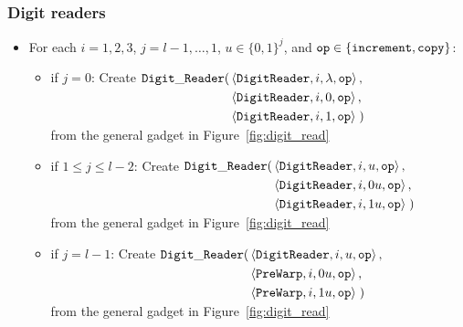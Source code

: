 \subsubsection{ Digit readers }

\begin{itemize}

\item For each $i = 1,2,3$,
                   $j = l-1,\ldots,1$,
                   $u \in \{0, 1\}^j$, and
                   ${\tt op} \in \{{\tt increment}, {\tt copy} \}$:
    \begin{itemize}
        \item if $j = 0$:
        Create
        $\begin{aligned}[t]
            {\tt Digit\_Reader}(& \left\langle {\tt DigitReader}, i, \lambda, {\tt op} \right\rangle, \\
                     & \left\langle {\tt DigitReader}, i, 0, {\tt op} \right\rangle, \\
                     & \left\langle {\tt DigitReader}, i, 1, {\tt op} \right\rangle \;)
        \end{aligned}$\\
        from the general gadget in Figure~\ref{fig:digit_read}

        \item if $1 \leqslant j \leqslant l -2$:
        Create
        $\begin{aligned}[t]
        {\tt Digit\_Reader}(& \left\langle {\tt DigitReader}, i, u, {\tt op} \right\rangle, \\
                 & \left\langle {\tt DigitReader}, i, 0u, {\tt op} \right\rangle, \\
                 & \left\langle {\tt DigitReader}, i, 1u, {\tt op} \right\rangle \;)
        \end{aligned}$\\
        from the general gadget in Figure~\ref{fig:digit_read}

        \item if $j = l - 1$:
        Create
        $\begin{aligned}[t]
            {\tt Digit\_Reader}(& \left\langle {\tt DigitReader}, i, u, {\tt op} \right\rangle, \\
                     & \left\langle {\tt PreWarp}, i, 0u, {\tt op} \right\rangle, \\
                     & \left\langle {\tt PreWarp}, i, 1u, {\tt op} \right\rangle \;)
        \end{aligned}$\\
        from the general gadget in Figure~\ref{fig:digit_read}

    \end{itemize}


\end{itemize}

